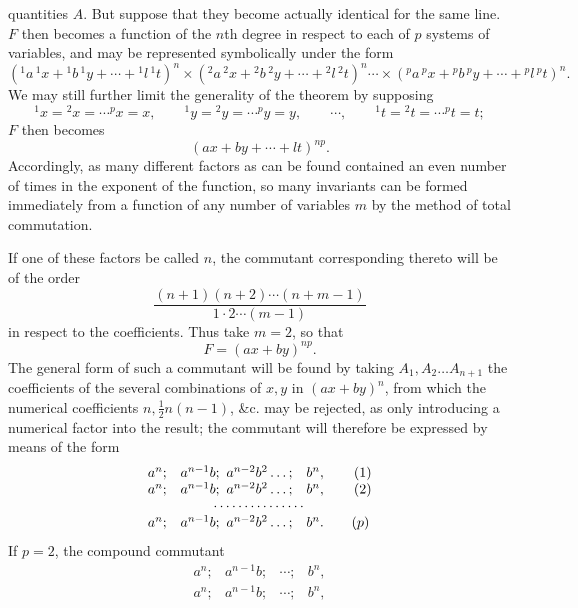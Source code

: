 \documentclass[11pt]{article}
\newcommand{\sourcepage}[1]{\marginpar{\scriptsize p.~#1}}
\begin{document}
{{\sourcepage{314}
quantities $A$. But suppose that they become actually identical for the same line. $F$ then becomes a function of the $n$th degree in respect to each of $p$ systems of variables, and may be represented symbolically under the form
\[
({}^{1}a\,{}^{1}x+{}^{1}b\,{}^{1}y+\cdots+{}^{1}l\,{}^{1}t)^n
\times({}^{2}a\,{}^{2}x+{}^{2}b\,{}^{2}y+\cdots+{}^{2}l\,{}^{2}t)^n
\cdots\times({}^{p}a\,{}^{p}x+{}^{p}b\,{}^{p}y+\cdots+{}^{p}l\,{}^{p}t)^n.
\]
We may still further limit the generality of the theorem by supposing
\[
{}^{1}x={}^{2}x=\cdots{}^{p}x=x,\qquad
{}^{1}y={}^{2}y=\cdots{}^{p}y=y,\qquad
\cdots,\qquad
{}^{1}t={}^{2}t=\cdots{}^{p}t=t;
\]
$F$ then becomes
\[
(ax+by+\cdots+lt)^{np}.
\]
Accordingly, as many different factors as can be found contained an even number of times in the exponent of the function, so many invariants can be formed immediately from a function of any number of variables $m$ by the method of total commutation.

If one of these factors be called $n$, the commutant corresponding thereto will be of the order
\[
\frac{(n+1)(n+2)\cdots(n+m-1)}{1\cdot2\cdots(m-1)}
\]
in respect to the coefficients. Thus take $m=2$, so that
\[
F=(ax+by)^{np}.
\]
The general form of such a commutant will be found by taking $A_1,A_2\ldots A_{n+1}$ the coefficients of the several combinations of $x,y$ in $(ax+by)^n$, from which the numerical coefficients $n,\frac12n(n-1)$, \&c. may be rejected, as only introducing a numerical factor into the result; the commutant will therefore be expressed by means of the form
\[
\begin{array}{rcl}
a^n;&a^{n-1}b;\ a^{n-2}b^2\ldots;&b^n,\qquad (1)\\
a^n;&a^{n-1}b;\ a^{n-2}b^2\ldots;&b^n,\qquad (2)\\
\multicolumn{3}{c}{\cdots\cdots\cdots\cdots\cdots}\\
a^n;&a^{n-1}b;\ a^{n-2}b^2\ldots;&b^n.\qquad (p)
\end{array}
\]
If $p=2$, the compound commutant
\[
\begin{array}{cccc}
a^n;&a^{n-1}b;&\cdots;&b^n,\\
a^n;&a^{n-1}b;&\cdots;&b^n,
\end{array}
\]

}}
\end{document}
